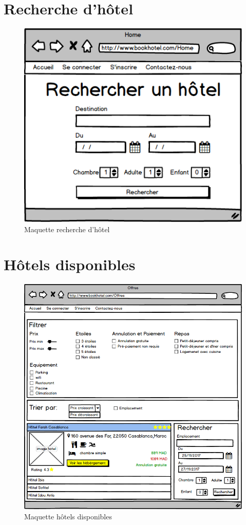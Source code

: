 \documentclass[12pt,a4paper]{report}
\begin{document}
	
	\section{Recherche d'hôtel}
	\begin{figure}[!hbtp]
		\centering
		\includegraphics[scale=0.5]{./graphics/3.png}
		\caption{Maquette recherche d'hôtel}
	\end{figure}
	
	
	\newpage
	\section{Hôtels disponibles}
	\vspace{2cm}
	\begin{figure}[!hbtp]
		\centering
		\includegraphics[scale=0.5]{./graphics/5.png}
		\caption{Maquette hôtels disponibles}
	\end{figure}
\end{document}
